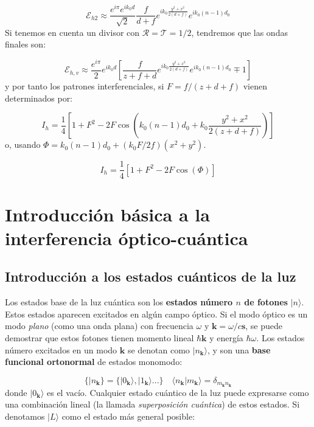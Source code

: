 \documentclass[12pt,a4paper]{book}
\numberwithin{equation}{section}
\numberwithin{figure}{section}
\newcommand{\parentesis}[1]{\left( #1  \right)}
\newcommand{\ccorchetes}[1]{\left[ #1  \right]}
\newcommand{\1}{_{(1)}}
\newcommand{\2}{_{(2)}}
\newcommand{\kn}{\mathbf{k}}
\newcommand{\sn}{\mathbf{s}}
\theoremstyle{definition}
\begin{document}
\begin{equation}
\mathcal{E}_{h2} \approx \frac{e^{i\pi}  e^{ik_0d}}{\sqrt{2}} \frac{f}{d+f} e^{ik_0\frac{y^2+x^2}{2(d+f)}}e^{ik_0(n-1)d_0}
\end{equation}
Si tenemos en cuenta un divisor con $\mathcal{R} = \mathcal{T} = 1/2$, tendremos que las ondas finales son:

\begin{equation}
\mathcal{E}_{h,v} \approx \frac{e^{i\pi}}{2} e^{ik_0d} \ccorchetes{\frac{f}{z+f+d} e^{ik_0\frac{y^2+x^2}{2(d+f)}} e^{ik_0(n-1)d_0}\mp 1}
\end{equation}
y por tanto los patrones interferenciales, si $F=f/(z+d+f)$ vienen determinados por:

\begin{equation}
I_h = \frac{1}{4} \ccorchetes{1+F^2-2F \cos \parentesis{k_0(n-1)d_0 + k_0 \frac{y^2+x^2}{2(z+d+f)}}}
\end{equation}
o, usando $\Phi=k_0 (n-1)d_0 + (k_0F/2f)(x^2+y^2)$.

\begin{equation}
I_h = \frac{1}{4} \ccorchetes{1+F^2-2F \cos \parentesis{\Phi}}
\end{equation}


\section{Introducción básica a la interferencia óptico-cuántica}
\subsection{Introducción a los estados cuánticos de la luz}

Los estados base de la luz cuántica son los \textbf{estados número $n$ de fotones} $|n\rangle$. Estos estados aparecen excitados en algún campo óptico. Si el modo óptico es un modo \textit{plano} (como una onda plana) con frecuencia $\omega$ y $\kn=\omega/c  \sn$, se puede demostrar que estos fotones tienen momento lineal $\hbar \kn$ y energía $\hbar \omega$. Los estados número excitados en un modo $\kn$ se denotan como $|n_\kn\rangle$, y son una \textbf{base funcional ortonormal} de estados monomodo:

\begin{equation}
\{ |n_\kn \} = \{ |0_\kn\rangle, |1_\kn\rangle... \} \quad \langle n_\kn | m_\kn \rangle = \delta_{m_\kn n_\kn} 
\end{equation}
donde $|0_\kn \rangle$ es el vacío. Cualquier estado cuántico de la luz puede expresarse como una combinación lineal (la llamada \textit{superposición cuántica}) de estos estados. Si denotamos $|L\rangle$ como el estado más general posible:
\end{document}
